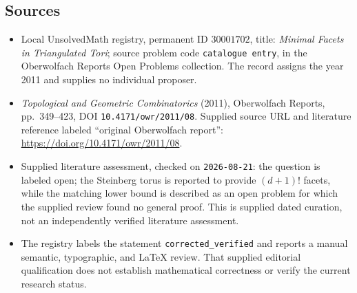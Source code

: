 \documentclass[11pt]{article}
\begin{document}
\subsection{Sources}
\begin{itemize}
\item Local UnsolvedMath registry, permanent ID \(30001702\), title: \emph{Minimal Facets in Triangulated Tori}; source problem code \texttt{catalogue entry}, in the Oberwolfach Reports Open Problems collection. The record assigns the year 2011 and supplies no individual proposer.
\item \emph{Topological and Geometric Combinatorics} (2011), Oberwolfach Reports, pp.\ 349--423, DOI \texttt{10.4171/owr/2011/08}. Supplied source URL and literature reference labeled ``original Oberwolfach report'': \url{https://doi.org/10.4171/owr/2011/08}.
\item Supplied literature assessment, checked on \texttt{2026-08-21}: the question is labeled open; the Steinberg torus is reported to provide \((d+1)!\) facets, while the matching lower bound is described as an open problem for which the supplied review found no general proof. This is supplied dated curation, not an independently verified literature assessment.
\item The registry labels the statement \texttt{corrected\_verified} and reports a manual semantic, typographic, and LaTeX review. That supplied editorial qualification does not establish mathematical correctness or verify the current research status.
\end{itemize}
\end{document}
